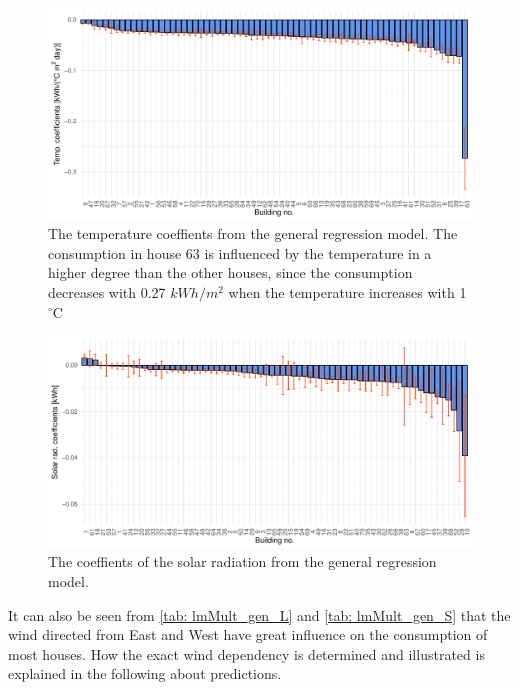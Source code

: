\begin{figure}
    \centering
    \includegraphics[width=1.\textwidth]{../../../figures/Temp_coef.pdf}
    \caption{The temperature coeffients from the general regression model. The consumption in house 63 is influenced by the temperature in a higher degree than the other houses, since the consumption decreases with 0.27 $kWh/m^2$ when the temperature increases with 1 $^{\circ}$C}
    \label{fig: Temp_coef}
\end{figure}
\begin{figure}
    \centering
    \includegraphics[width=1.\textwidth]{../../../figures/Solar_coef.pdf}
    \caption{The coeffients of the solar radiation from the general regression model.}
    \label{fig: Solar_coef}
\end{figure}

\noindent It can also be seen from \cref{tab: lmMult_gen_L} and \cref{tab: lmMult_gen_S} that the wind directed from East and West have great influence on the consumption of most houses. How the exact wind dependency is determined and illustrated is explained in the following about predictions.

